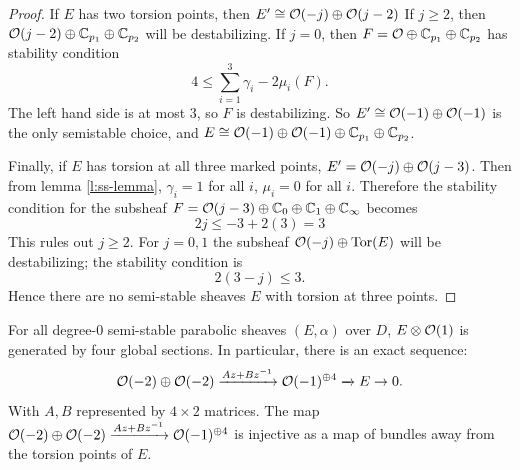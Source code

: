 \begin{proof}
		If $E$ has two torsion points, then $E'\cong \mathcal{O}(-j)\oplus\mathcal{O}(j-2)$ If $j\geq 2$, then $\mathcal{O}(j-2)\oplus \mathbb{C}_{p_1}\oplus \mathbb{C}_{p_2}$ will be destabilizing. If $j=0$, then $F=\mathcal{O}\oplus\mathbb{C}_{p_1}\oplus \mathbb{C}_{p_2}$ has stability condition
		\begin{equation}
			4 \leq \sum_{i=1}^3 \gamma_i - 2\mu_i(F).
		\end{equation}
		The left hand side is at most 3, so $F$ is destabilizing. So $E' \cong \mathcal{O}(-1)\oplus \mathcal{O}(-1)$ is the only semistable choice, and $E \cong \mathcal{O}(-1)\oplus \mathcal{O}(-1)\oplus \mathbb{C}_{p_1} \oplus \mathbb{C}_{p_2}$. 
		
		Finally, if $E$ has torsion at all three marked points, $E' = \mathcal{O}(-j)\oplus \mathcal{O}(j-3)$. Then from lemma \ref{l:ss-lemma}, $\gamma_i = 1$ for all $i$, $\mu_i = 0$ for all $i$.  Therefore the stability condition for the subsheaf $F=\mathcal{O}(j-3)\oplus\mathbb{C}_{0}\oplus \mathbb{C}_{1}\oplus \mathbb{C}_{\infty}$ becomes
		\begin{equation}
			2j \leq -3 + 2(3) = 3
		\end{equation}
		This rules out $j\geq 2$. For $j=0,1$ the subsheaf $\mathcal{O}(-j)\oplus\text{Tor}(E)$ will be destabilizing; the stability condition is
		\begin{equation}
			2(3-j) \leq 3.
		\end{equation}
		Hence there are no semi-stable sheaves $E$ with torsion at three points.
	\end{proof}
	\begin{theorem}
		\label{t:exactseq}
		For all degree-0 semi-stable parabolic sheaves $(E,\alpha)$ over $D$, $E\otimes \mathcal{O}(1)$ is generated by four global sections. In particular, there is an exact sequence:
		\begin{equation}
		\mathcal{O}(-2)\oplus \mathcal{O}(-2) \xrightarrow{Az+Bz^{-1}} \mathcal{O}(-1)^{\oplus 4} \xrightarrow{} E \to 0.
		\end{equation}
		With $A,B$ represented by $4\times 2$ matrices. The map $\mathcal{O}(-2)\oplus \mathcal{O}(-2) \xrightarrow{Az+Bz^{-1}} \mathcal{O}(-1)^{\oplus 4}$ is injective as a map of bundles away from the torsion points of $E$.
	\end{theorem}
